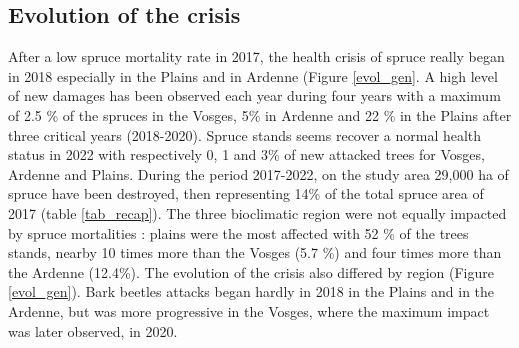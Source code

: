 \documentclass[3p,procedia]{elsarticle}
\begin{document}
\subsection{Evolution of the crisis}

After a low spruce mortality rate in 2017, the health crisis of spruce really began in 2018 especially in the Plains and in Ardenne (Figure \ref{evol_gen}.
A high level of new damages has been observed each year during four years with a maximum of 2.5 \% of the spruces in the Vosges, 5\% in Ardenne and 22 \% in the Plains after three critical years (2018-2020).
Spruce stands seems recover a normal health status in 2022 with respectively 0, 1 and 3\% of new attacked trees for Vosges, Ardenne and Plains.
During the period 2017-2022, on the study area 29,000 ha of spruce have been destroyed, then representing 14\%  of the total spruce area of 2017 (table \ref{tab_recap}).
The three bioclimatic region were not equally impacted by spruce mortalities : 
plains were the most affected with 52 \% of the trees stands,  nearby 10 times more than the Vosges (5.7 \%) and four times more than the Ardenne (12.4\%).
The evolution of the crisis also differed by region (Figure \ref{evol_gen}).
Bark beetles attacks began hardly in 2018 in the Plains and in the Ardenne, but was more progressive in the Vosges, where the maximum impact was later observed, in 2020.
\end{document}
